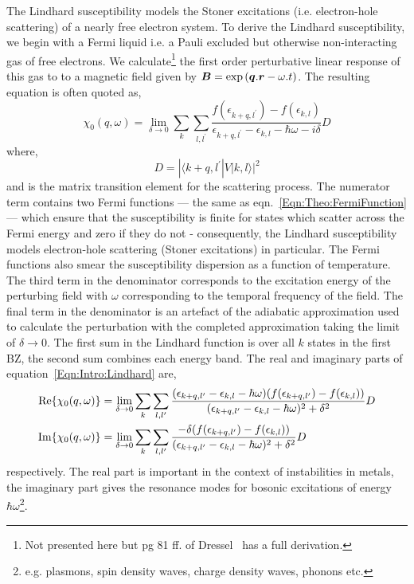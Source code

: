 The Lindhard susceptibility models the Stoner excitations (i.e. electron-hole scattering) of a nearly free electron system. To derive the Lindhard susceptibility, we begin with a Fermi liquid i.e. a Pauli excluded but otherwise non-interacting gas of free electrons. We calculate\footnote{Not presented here but pg 81 ff. of Dressel~\cite{Dressel2002} has a full derivation.} the first order perturbative linear response of this gas to to a magnetic field given by $\boldsymbol{B}=\exp{(\boldsymbol{q}.\boldsymbol{r} - \omega.t})$. The resulting equation is often quoted as,
\begin{equation}
    \chi_0(q, \omega) = \lim_{\delta \to 0} \sum_{k}\sum_{l,l^\prime}\frac{f(\epsilon_{k+q,l^\prime}) - f(\epsilon_{k,l})}{\epsilon_{k+q,l^\prime} - \epsilon_{k,l} - \hbar\omega - i\delta}D
    \label{Eqn:Intro:Lindhard}
\end{equation}
where,
\begin{equation}
    D = |\langle k+q,l^\prime|V|k,l \rangle|^2
\end{equation}
and is the matrix transition element for the scattering process. The numerator term contains two Fermi functions --- the same as eqn.~\ref{Eqn:Theo:FermiFunction} --- which ensure that the susceptibility is finite for states which scatter across the Fermi energy and zero if they do not - consequently, the Lindhard susceptibility models electron-hole scattering (Stoner excitations) in particular. The Fermi functions also smear the susceptibility dispersion as a function of temperature. The third term in the denominator corresponds to the excitation energy of the perturbing field with $\omega$ corresponding to the temporal frequency of the field. The final term in the denominator is an artefact of the adiabatic approximation used to calculate the perturbation with the completed approximation taking the limit of $\delta \to 0$. The first sum in the Lindhard function is over all $k$ states in the first \ac{BZ}, the second sum combines each energy band. The real and imaginary parts of equation~\ref{Eqn:Intro:Lindhard} are,
\begin{align}
\operatorname{Re}\{\chi_0(q, \omega)\} &= \lim_{\delta \to 0} \sum_{k}\sum_{l, l^\prime}\frac{(\epsilon_{k+q,l^\prime} - \epsilon_{k,l} - \hbar\omega) (f(\epsilon_{k+q,l^\prime}) - f(\epsilon_{k,l}))}{(\epsilon_{k+q,l^\prime} - \epsilon_{k,l} - \hbar\omega)^2 + \delta^2}D \\
\label{Eqn:Theo:ReLindhard}
\operatorname{Im}\{\chi_0(q, \omega)\} &= \lim_{\delta \to 0} \sum_{k}\sum_{l, l^\prime}\frac{-\delta (f(\epsilon_{k+q,l^\prime}) - f(\epsilon_{k,l}))}{(\epsilon_{k+q,l^\prime} - \epsilon_{k,l} - \hbar\omega)^2 + \delta^2}D\\
\label{Eqn:Theo:ImLindhard}
\end{align}
respectively. The real part is important in the context of instabilities in metals, the imaginary part gives the resonance modes for bosonic excitations of energy $\hbar\omega$\footnote{e.g. plasmons, spin density waves, charge density waves, phonons etc.}.

